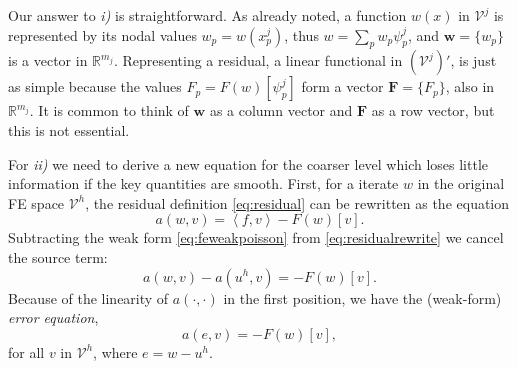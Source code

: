 \documentclass[letterpaper,final,12pt,reqno]{amsart}
\theoremstyle{claim}
\newcommand{\RR}{\mathbb{R}}
\newcommand{\bw}{\mathbf{w}}
\newcommand{\bF}{\mathbf{F}}
\newcommand{\ip}[2]{\left<#1,#2\right>}
\numberwithin{equation}{section}
\numberwithin{figure}{section}
\numberwithin{table}{section}
\begin{document}
Our answer to \emph{i)} is straightforward.  As already noted, a function $w(x)$ in $\mathcal{V}^j$ is represented by its nodal values $w_p=w(x_p^j)$, thus $w = \sum_p w_p \psi_p^j$, and $\bw = \{w_p\}$ is a vector in $\RR^{m_j}$.  Representing a residual, a linear functional in $(\mathcal{V}^j)'$, is just as simple because the values $F_p = F(w)[\psi_p^j]$ form a vector $\bF=\{F_p\}$, also in $\RR^{m_j}$.  It is common to think of $\bw$ as a column vector and $\bF$ as a row vector, but this is not essential.

For \emph{ii)} we need to derive a new equation for the coarser level which loses little information if the key quantities are smooth.  First, for a iterate $w$ in the original FE space $\mathcal{V}^h$, the residual definition \eqref{eq:residual} can be rewritten as the equation
\begin{equation}
  a(w,v) = \ip{f}{v} - F(w)[v].  \label{eq:residualrewrite}
\end{equation}
Subtracting the weak form \eqref{eq:feweakpoisson} from \eqref{eq:residualrewrite} we cancel the source term:
\begin{equation}
  a(w,v) - a(u^h,v) = - F(w)[v].  \label{eq:errorequationearly}
\end{equation}
Because of the linearity of $a(\cdot,\cdot)$ in the first position, we have the (weak-form) \emph{error equation},
\begin{equation}
  a(e,v) = - F(w)[v],  \label{eq:errorequation}
\end{equation}
for all $v$ in $\mathcal{V}^h$, where $e=w-u^h$.
\end{document}
